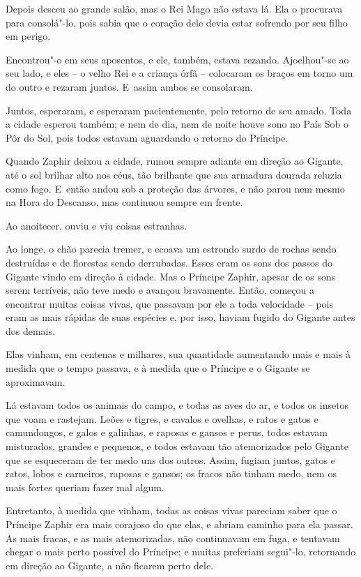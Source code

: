 
Depois desceu ao grande salão, mas o Rei Mago não estava lá. Ela o
procurava para consolá"-lo, pois sabia que o coração dele devia estar
sofrendo por seu filho em perigo.

Encontrou"-o em seus aposentos, e ele, também, estava rezando.
Ajoelhou"-se ao seu lado, e eles -- o velho Rei e a criança órfã --
colocaram os braços em torno um do outro e rezaram juntos. E~assim ambos
se consolaram.


Juntos, esperaram, e esperaram pacientemente, pelo retorno de seu amado.
Toda a cidade esperou também; e nem de dia, nem de noite houve sono no
País Sob o Pôr do Sol, pois todos estavam aguardando o retorno do
Príncipe.

Quando Zaphir deixou a cidade, rumou sempre adiante em direção ao
Gigante, até o sol brilhar alto nos céus, tão brilhante que sua armadura
dourada reluzia como fogo. E~então andou sob a proteção das árvores, e
não parou nem mesmo na Hora do Descanso, mas continuou sempre em frente.

Ao anoitecer, ouviu e viu coisas estranhas.

Ao longe, o chão parecia tremer, e ecoava um estrondo surdo de rochas
sendo destruídas e de florestas sendo derrubadas. Esses eram os sons dos
passos do Gigante vindo em direção à cidade. Mas o Príncipe Zaphir,
apesar de os sons serem terríveis, não teve medo e avançou bravamente.
Então, começou a encontrar muitas coisas vivas, que passavam por ele a
toda velocidade -- pois eram as mais rápidas de suas espécies e, por
isso, haviam fugido do Gigante antes dos demais.

Elas vinham, em centenas e milhares, sua quantidade aumentando mais e
mais à medida que o tempo passava, e à medida que o Príncipe e o Gigante
se aproximavam.

Lá estavam todos os animais do campo, e todas as aves do ar, e todos os
insetos que voam e rastejam. Leões e tigres, e cavalos e ovelhas, e
ratos e gatos e camundongos, e galos e galinhas, e raposas e gansos e
perus, todos estavam misturados, grandes e pequenos, e todos estavam tão
atemorizados pelo Gigante que se esqueceram de ter medo uns dos outros.
Assim, fugiam juntos, gatos e ratos, lobos e carneiros, raposas e
gansos; os fracos não tinham medo, nem os mais fortes queriam fazer mal
algum.

Entretanto, à medida que vinham, todas as coisas vivas pareciam saber
que o Príncipe Zaphir era mais corajoso do que elas, e abriam caminho
para ela passar. As mais fracas, e as mais atemorizadas, não
continuavam em fuga, e tentavam chegar o mais perto possível do
Príncipe; e muitas preferiam segui"-lo, retornando em direção ao Gigante,
a não ficarem perto dele.


